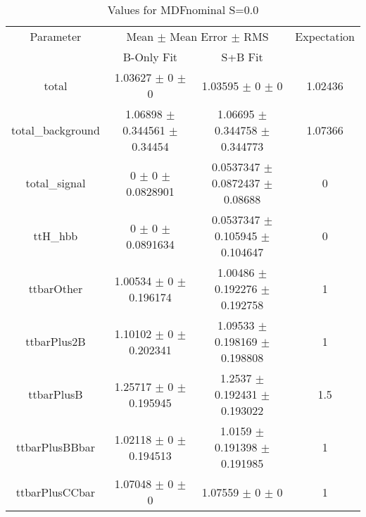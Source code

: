 \begin{table}
\centering
\caption{Values for MDFnominal S=0.0}
\begin{tabular}{cccc}
\toprule
Parameter & \multicolumn{2}{c}{Mean $\pm$ Mean Error $\pm$ RMS} & Expectation\\
 & B-Only Fit & S+B Fit & \\
\midrule
total & \num{1.03627} $\pm$ \num{0} $\pm$ \num{0} & \num{1.03595} $\pm$ \num{0} $\pm$ \num{0} & \num{1.02436}\\
total\_background & \num{1.06898} $\pm$ \num{0.344561} $\pm$ \num{0.34454} & \num{1.06695} $\pm$ \num{0.344758} $\pm$ \num{0.344773} & \num{1.07366}\\
total\_signal & \num{0} $\pm$ \num{0} $\pm$ \num{0.0828901} & \num{0.0537347} $\pm$ \num{0.0872437} $\pm$ \num{0.08688} & \num{0}\\
ttH\_hbb & \num{0} $\pm$ \num{0} $\pm$ \num{0.0891634} & \num{0.0537347} $\pm$ \num{0.105945} $\pm$ \num{0.104647} & \num{0}\\
ttbarOther & \num{1.00534} $\pm$ \num{0} $\pm$ \num{0.196174} & \num{1.00486} $\pm$ \num{0.192276} $\pm$ \num{0.192758} & \num{1}\\
ttbarPlus2B & \num{1.10102} $\pm$ \num{0} $\pm$ \num{0.202341} & \num{1.09533} $\pm$ \num{0.198169} $\pm$ \num{0.198808} & \num{1}\\
ttbarPlusB & \num{1.25717} $\pm$ \num{0} $\pm$ \num{0.195945} & \num{1.2537} $\pm$ \num{0.192431} $\pm$ \num{0.193022} & \num{1.5}\\
ttbarPlusBBbar & \num{1.02118} $\pm$ \num{0} $\pm$ \num{0.194513} & \num{1.0159} $\pm$ \num{0.191398} $\pm$ \num{0.191985} & \num{1}\\
ttbarPlusCCbar & \num{1.07048} $\pm$ \num{0} $\pm$ \num{0} & \num{1.07559} $\pm$ \num{0} $\pm$ \num{0} & \num{1}\\
\bottomrule
\end{tabular}
\end{table}